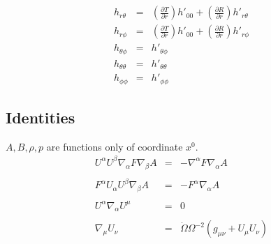 \documentclass[10pt,letterpaper]{article}
\numberwithin{equation}{section}
\begin{document}
\begin{eqnarray}
\nonumber\\
h_{r\theta} &=& \left( \frac{\partial T}{\partial r}\right)h'_{00} + \left( \frac{\partial R}{\partial r}\right)h'_{r\theta}
\nonumber\\
h_{r\phi} &=& \left( \frac{\partial T}{\partial r}\right)h'_{00} + \left( \frac{\partial R}{\partial r}\right)h'_{r\phi}
\nonumber\\
h_{\theta\phi} &=& h'_{\theta\phi}
\nonumber\\
h_{\theta\theta} &=& h'_{\theta\theta}
\nonumber\\
h_{\phi\phi} &=& h'_{\phi\phi}
\end{eqnarray}
%
%
\subsection{Identities}
$A, B, \rho, p$ are functions only of coordinate $x^0$. 
\begin{eqnarray}
U^\alpha U^\beta \nabla_\alpha F\nabla_\beta A &=& -\nabla^\alpha F \nabla_\alpha A
\\ \nonumber\\
F^\alpha U_\alpha U^\beta \nabla_\beta A &=& -F^\alpha \nabla_\alpha A
\\ \nonumber\\
U^\alpha\nabla_\alpha U^\mu &=& 0
\\ \nonumber\\
\nabla_\mu U_\nu &=& \dot\Omega \Omega^{-2}(g_{\mu\nu} + U_{\mu}U_\nu)
\end{eqnarray}
%
%
\newpage
\end{document}
